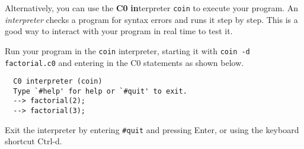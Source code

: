 Alternatively, you can use the \textbf{\color{red}C0}
\textbf{\color{red}in}terpreter \lstinline[language={[coin]C}]'coin' to execute
your program. An \emph{interpreter} checks a program for syntax errors
and runs it step by step.  This is a good way to interact with your
program in real time to test it.

\begin{part}
  Run your program in the \lstinline[language={[coin]C}]'coin'
  interpreter, starting it with %
  \lstinline[language={[coin]C}]'coin -d factorial.c0' %
  and entering in the C0 statements as shown below.
\begin{lstlisting}[language={[coin]C}, belowskip=-2ex]
  % coin -d factorial.c0
  C0 interpreter (coin)
  Type `#help' for help or `#quit' to exit.
  --> factorial(2);
  --> factorial(3);
\end{lstlisting}
\end{part}
Exit the interpreter by entering \lstinline[language={[coin]C}]'#quit' and
pressing Enter, or using the keyboard shortcut Ctrl-d.

\begin{comment}
Some of the outputs \lstinline[language={[coin]C}]'coin' gives should
strike you as odd. We'll learn about what's going on in class.

\begin{part}\TAGS{intepreter}
  Factorial $n!$ is only defined on non-negative numbers. Try to
  compute a non-existent factorial:
\begin{lstlisting}[language={[coin]C}, belowskip=-1.5ex]
  --> factorial(-1);
\end{lstlisting}
\end{part}

You should see an annotation failure.  This is because our factorial
function starts with the requirement: \lstinline'//@requires n >= 0;'.
Since we called this function with a value for $n$ that does not
satisfy this requirement, we get an annotation failure since it
doesn't make sense to run this function with $n = -1$.

\begin{part}\TAGS{intepreter}
  Exit the interpreter by entering
  \lstinline[language={[coin]C}]'#quit'.  Start it again, this time without the
  \lstinline[language={[coin]C}]'-d' flag by typing
  \lstinline[language={[coin]C}]'coin factorial.c0' at the prompt.  Now, run
  \lstinline[language={[coin]C}]'factorial(-1);' again.  What do you observe?
\end{part}
\end{comment}
